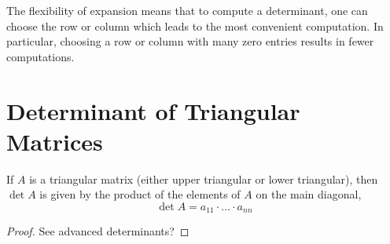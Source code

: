 \documentclass[letterpaper,12pt]{article}
\begin{document}
The flexibility of expansion means that to compute a determinant, one can choose the row or column which leads to the most convenient computation. In particular, choosing a row or column with many zero entries results in fewer computations.


\section*{Determinant of Triangular Matrices}

\begin{theorem}
If $A$ is a triangular matrix (either upper triangular or lower triangular), then $\det{A}$ is given by the product of the elements of $A$ on the main diagonal,
\begin{equation*}
    \boxed{\det{A} = a_{11} \cdot \dots \cdot a_{nn}}
\end{equation*}
\end{theorem}

\begin{proof}
See advanced determinants?
\end{proof}
\end{document}

